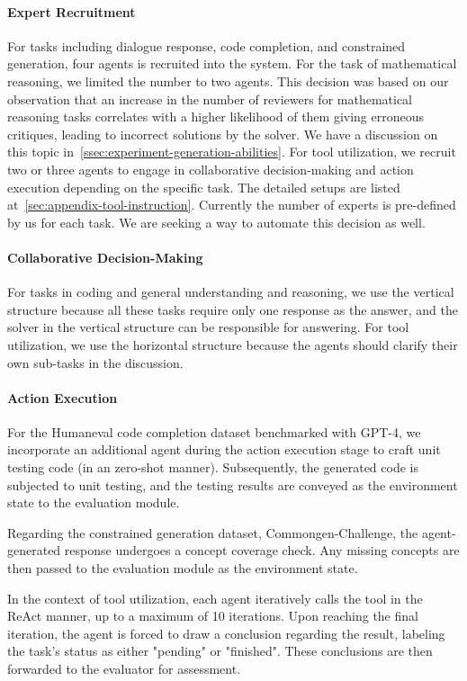 \paragraph{Expert Recruitment}
For tasks including dialogue response, code completion, and constrained generation, four agents is recruited into the system. For the task of mathematical reasoning, we limited the number to two agents. This decision was based on our observation that an increase in the number of reviewers for mathematical reasoning tasks correlates with a higher likelihood of them giving erroneous critiques, leading to incorrect solutions by the solver. We have a discussion on this topic in~\cref{ssec:experiment-generation-abilities}. For tool utilization, we recruit two or three agents to engage in collaborative decision-making and action execution depending on the specific task. The detailed setups are listed at~\cref{sec:appendix-tool-instruction}. Currently the number of experts is pre-defined by us for each task. We are seeking a way to automate this decision as well.

\paragraph{Collaborative Decision-Making}
For tasks in coding and general understanding and reasoning, we use the vertical structure because all these tasks require only one response as the answer, and the solver in the vertical structure can be responsible for answering. For tool utilization, we use the horizontal structure because the agents should clarify their own sub-tasks in the discussion. 

\paragraph{Action Execution}
For the Humaneval code completion dataset benchmarked with GPT-4, we incorporate an additional agent during the action execution stage to craft unit testing code (in an zero-shot manner). Subsequently, the generated code is subjected to unit testing, and the testing results are conveyed as the environment state to the evaluation module.

Regarding the constrained generation dataset, Commongen-Challenge, the agent-generated response undergoes a concept coverage check. Any missing concepts are then passed to the evaluation module as the environment state.

In the context of tool utilization, each agent iteratively calls the tool in the ReAct manner, up to a maximum of 10 iterations. Upon reaching the final iteration, the agent is forced to draw a conclusion regarding the result, labeling the task's status as either "pending" or "finished". These conclusions are then forwarded to the evaluator for assessment.

